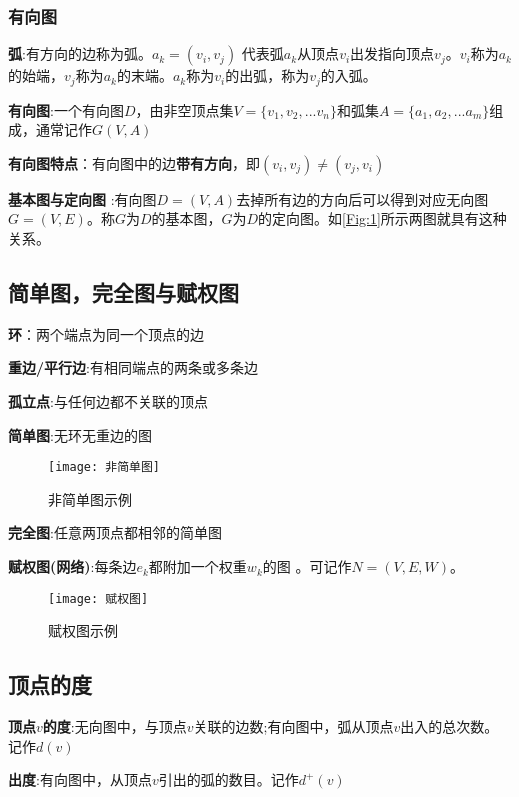 \documentclass[withoutpreface]{cumcmthesis}
\begin{document}
\subsubsection{有向图}

\textbf{弧}:有方向的边称为弧。$a_k=(v_i,v_j)$ 代表弧$a_k$从顶点$v_i$出发指向顶点$v_j$。$v_i$称为$a_k$的始端，$v_j$称为$a_k$的末端。$a_k$称为$v_i$的出弧，称为$v_j$的入弧。

\textbf{有向图}:一个有向图$D$，由非空顶点集$V=\{v_1,v_2,...v_n\}$和弧集$A=\{a_1,a_2,...a_m\}$组成，通常记作$G(V,A)$

\textbf{有向图特点}：有向图中的边\textbf{带有方向}，即$(v_i,v_j)\ne(v_j,v_i)$

\textbf{基本图与定向图} :有向图$D=(V,A)$去掉所有边的方向后可以得到对应无向图$G=(V,E)$。称$G$为$D$的基本图，$G$为$D$的定向图。如\cref{Fig:1}所示两图就具有这种关系。

\subsection{简单图，完全图与赋权图}

\textbf{环}：两个端点为同一个顶点的边

\textbf{重边/平行边}:有相同端点的两条或多条边

\textbf{孤立点}:与任何边都不关联的顶点

\textbf{简单图}:无环无重边的图

\begin{figure}[H]
  \centering
  \texttt{[image: 非简单图]}
  \caption{非简单图示例}
\end{figure}

\textbf{完全图}:任意两顶点都相邻的简单图

\textbf{赋权图(网络)}:每条边$e_k$都附加一个权重$w_k$的图 。可记作$N=(V,E,W)$。

\begin{figure}[H]
  \centering
  \texttt{[image: 赋权图]}
  \caption{赋权图示例}
\end{figure}

\subsection{顶点的度}

\textbf{顶点$v$的度}:无向图中，与顶点$v$关联的边数;有向图中，弧从顶点$v$出入的总次数。记作$d(v)$

\textbf{出度}:有向图中，从顶点$v$引出的弧的数目。记作$d^+(v)$
\end{document}
